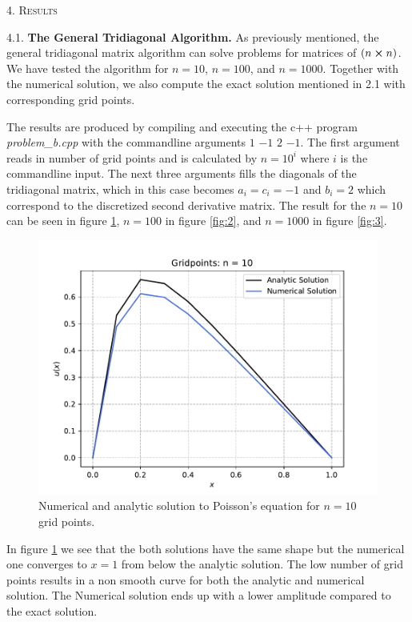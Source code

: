 \documentclass[a4paper,10pt]{article}
\begin{document}
\bigskip

\begin{center}
\textsc{4. Results}
\end{center}
4.1. \textbf{The General Tridiagonal Algorithm.} As previously mentioned, the general tridiagonal matrix algorithm can solve problems for matrices of $(n \cross n)$. We have tested the algorithm for $n = 10$, $n = 100$, and  $n = 1000$. Together with the numerical solution, we also compute the exact solution mentioned in 2.1 with corresponding grid points. 

The results are produced by compiling and executing the c++ program \textit{problem\_b.cpp} with the commandline arguments $1$ $-1$ $2$ $-1$. The first argument reads in number of grid points and is calculated by $n = 10^i$ where $i$ is the commandline input. The next three arguments fills the diagonals of the tridiagonal matrix, which in this case becomes $a_i = c_i  = -1$ and $b_i = 2$ which correspond to the discretized second derivative matrix. The result for the $n= 10$ can be seen in figure \ref{fig:1}, $n = 100$ in figure \ref{fig:2}, and $n=1000$ in figure \ref{fig:3}.

\begin{figure}[h]
  \centering
  \includegraphics[width=0.9\linewidth]{figures/fig_10_b.pdf}
  \caption{Numerical and analytic solution to Poisson's equation for $n = 10$ grid points. }
  \label{fig:1}
\end{figure}

In figure \ref{fig:1} we see that the both solutions have the same shape but the numerical one converges to $x=1$ from below the analytic solution. The low number of grid points results in a non smooth curve for both the analytic and numerical solution. The Numerical solution ends up with a lower amplitude compared to the exact solution.
\end{document}
